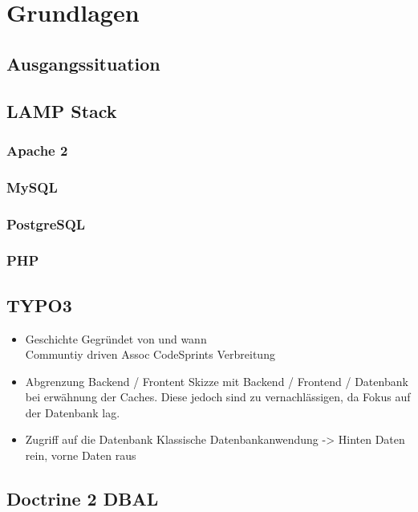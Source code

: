 \chapter{Grundlagen}
\label{ch:basics}

\section{Ausgangssituation}

\section{LAMP Stack}
	\subsection{Apache 2}
	\subsection{MySQL}
	\subsection{PostgreSQL}
	\subsection{PHP}
	
\section{TYPO3}
	\begin{itemize}
		\item Geschichte
		Gegründet von und wann \\
		Communtiy driven
		Assoc
		CodeSprints
		Verbreitung
		\item Abgrenzung Backend / Frontent
		Skizze mit Backend / Frontend / Datenbank bei erwähnung der Caches. Diese jedoch sind zu vernachlässigen, da
		Fokus auf der Datenbank lag.
		\item Zugriff auf die Datenbank
		Klassische Datenbankanwendung -> Hinten Daten rein, vorne Daten raus
	\end{itemize}
\section{Doctrine 2 DBAL}
